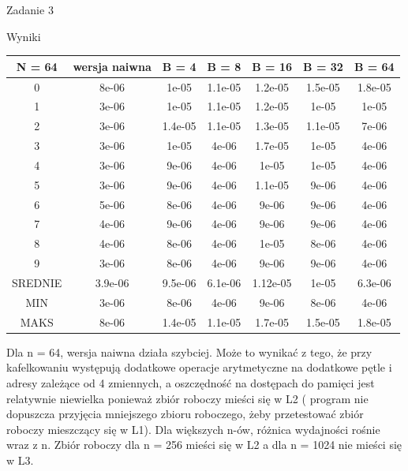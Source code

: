 \documentclass[11pt,wide]{mwart}
\begin{document}
\begin{section}{Zadanie 3}
\begin{subsection}{Wyniki}
\begin{center}
\begin{tabular}{|c|c|c|c|c|c|c|}
\hline
N = 64 &wersja naiwna & B = 4 & B = 8 & B = 16 & B = 32 & B = 64\\
\hline
0 & 8e-06 & 1e-05 & 1.1e-05 & 1.2e-05 & 1.5e-05 & 1.8e-05\\
\hline
1 & 3e-06 & 1e-05 & 1.1e-05 & 1.2e-05 & 1e-05 & 1e-05\\
\hline
2 & 3e-06 & 1.4e-05 & 1.1e-05 & 1.3e-05 & 1.1e-05 & 7e-06\\
\hline
3 & 3e-06 & 1e-05 & 4e-06 & 1.7e-05 & 1e-05 & 4e-06\\
\hline
4 & 3e-06 & 9e-06 & 4e-06 & 1e-05 & 1e-05 & 4e-06\\
\hline
5 & 3e-06 & 9e-06 & 4e-06 & 1.1e-05 & 9e-06 & 4e-06\\
\hline
6 & 5e-06 & 8e-06 & 4e-06 & 9e-06 & 9e-06 & 4e-06\\
\hline
7 & 4e-06 & 9e-06 & 4e-06 & 9e-06 & 9e-06 & 4e-06\\
\hline
8 & 4e-06 & 8e-06 & 4e-06 & 1e-05 & 8e-06 & 4e-06\\
\hline
9 & 3e-06 & 8e-06 & 4e-06 & 9e-06 & 9e-06 & 4e-06\\
\hline
SREDNIE & 3.9e-06 & 9.5e-06 & 6.1e-06 & 1.12e-05 & 1e-05 & 6.3e-06\\
\hline
MIN & 3e-06 & 8e-06 & 4e-06 & 9e-06 & 8e-06 & 4e-06\\
\hline
MAKS & 8e-06 & 1.4e-05 & 1.1e-05 & 1.7e-05 & 1.5e-05 & 1.8e-05\\
\hline
\end{tabular}
\end{center}

Dla n = 64, wersja naiwna działa szybciej. Może to wynikać z tego, że przy kafelkowaniu występują dodatkowe operacje arytmetyczne na dodatkowe pętle i adresy zależące od 4 zmiennych, a oszczędność na dostępach do pamięci jest relatywnie niewielka ponieważ zbiór roboczy mieści się w L2 ( program nie dopuszcza przyjęcia mniejszego zbioru roboczego, żeby przetestować zbiór roboczy mieszczący się w L1). Dla większych n-ów, różnica wydajności rośnie wraz z n. Zbiór roboczy dla n = 256 mieści się w L2 a dla n = 1024 nie mieści się w L3. 

\end{subsection}
 
 \end{section}
 
\end{document}
